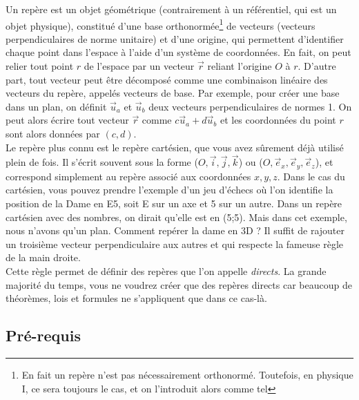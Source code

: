 \documentclass{article}
\begin{document}
Un repère est un objet géométrique (contrairement à un référentiel, qui est un objet physique), constitué d'une base orthonormée\footnote{En fait un repère n'est pas nécessairement orthonormé. Toutefois, en physique I, ce sera toujours le cas, et on l'introduit alors comme tel} de vecteurs (vecteurs perpendiculaires 
de norme unitaire) et d'une origine, qui permettent d'identifier chaque point dans l'espace à l'aide d'un système de coordonnées. En fait, on peut relier tout point $r$ de l'espace par un vecteur $\vec r$ reliant l'origine $O$ à $r$. D'autre part, tout vecteur peut être décomposé comme une combinaison linéaire des vecteurs du repère, appelés vecteurs de base. Par exemple, pour créer une base dans un plan, on définit $\vec u_a$ et $\vec u_b$ deux vecteurs perpendiculaires de normes 1. On peut alors écrire tout vecteur $\vec r$ comme $c\vec u_a + d\vec u_b$ et les coordonnées du point $r$ sont alors données par $(c,d)$.\\ 
Le repère plus connu est le repère cartésien, que vous avez sûrement déjà utilisé plein de fois. Il s'écrit souvent sous la forme ($O,\vec i,\vec j,\vec k$) ou ($O,\vec e_x,\vec e_y,\vec e_z$), et correspond simplement au repère associé aux coordonnées $x,y,z$. Dans le cas du cartésien,
 vous pouvez prendre l'exemple d'un jeu d'échecs où l'on identifie la position de la Dame en E5, soit E sur un axe et 5 sur un autre. 
Dans un repère cartésien avec des nombres, on dirait qu'elle est en (5;5). Mais dans cet exemple, nous n'avons qu'un plan. Comment repérer la dame en 3D ? Il suffit de rajouter un troisième vecteur perpendiculaire aux autres et qui respecte la fameuse règle de la main droite. \\
Cette règle permet de définir des repères que l'on appelle \emph{directs}. La grande majorité du temps, vous ne voudrez créer que des repères directs car beaucoup de théorèmes, lois et formules ne s'appliquent que dans ce cas-là. \\

\subsection{Pré-requis}
\end{document}
